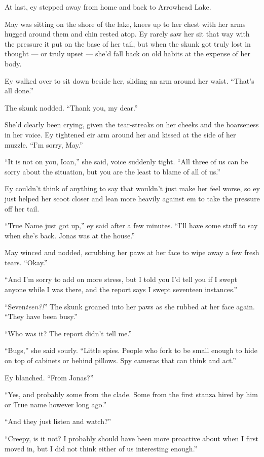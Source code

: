 At last, ey stepped away from home and back to Arrowhead Lake.

May was sitting on the shore of the lake, knees up to her chest with her arms hugged around them and chin rested atop. Ey rarely saw her sit that way with the pressure it put on the base of her tail, but when the skunk got truly lost in thought — or truly upset — she'd fall back on old habits at the expense of her body.

Ey walked over to sit down beside her, sliding an arm around her waist. ``That's all done.''

The skunk nodded. ``Thank you, my dear.''

She'd clearly been crying, given the tear-streaks on her cheeks and the hoarseness in her voice. Ey tightened eir arm around her and kissed at the side of her muzzle. ``I'm sorry, May.''

``It is not on you, Ioan,'' she said, voice suddenly tight. ``All three of us can be sorry about the situation, but you are the least to blame of all of us.''

Ey couldn't think of anything to say that wouldn't just make her feel worse, so ey just helped her scoot closer and lean more heavily against em to take the pressure off her tail.

``True Name just got up,'' ey said after a few minutes. ``I'll have some stuff to say when she's back. Jonas was at the house.''

May winced and nodded, scrubbing her paws at her face to wipe away a few fresh tears. ``Okay.''

``And I'm sorry to add on more stress, but I told you I'd tell you if I swept anyone while I was there, and the report says I swept seventeen instances.''

``Seven\emph{teen?!}'' The skunk groaned into her paws as she rubbed at her face again. ``They have been busy.''

``Who was it? The report didn't tell me.''

``Bugs,'' she said sourly. ``Little spies. People who fork to be small enough to hide on top of cabinets or behind pillows. Spy cameras that can think and act.''

Ey blanched. ``From Jonas?''

``Yes, and probably some from the clade. Some from the first stanza hired by him or True name however long ago.''

``And they just listen and watch?''

``Creepy, is it not? I probably should have been more proactive about when I first moved in, but I did not think either of us interesting enough.''

